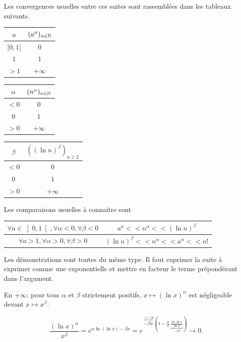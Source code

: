 \begin{prop}
Les convergences usuelles entre ces suites sont rassemblées dans les tableaux suivants. 
\renewcommand{\arraystretch}{1.3}
\begin{center}
\hfill
\begin{tabular}{c|c}
$a$  & $(a^n)_{n\in\mathbb{N}}$\\ \hline
$]0,1[$ & 0 \\ \hline
$1$ & $1$ \\ \hline
$>1$ & $+\infty$
\end{tabular}
\hfill
\begin{tabular}{c|c}
$\alpha$  & $(n^\alpha)_{n\in\mathbb{N}}$\\ \hline
$<0$ & $0$ \\ \hline
$0$ & $1$ \\ \hline
$>0$ & $+\infty$
\end{tabular}
\hfill
\begin{tabular}{c|c}
$\beta$  & $((\ln n)^\beta)_{n\geq 2}$\\ \hline
$<0$ & $0$ \\ \hline
$0$ & $1$ \\ \hline
$>0$ & $+\infty$
\end{tabular}
\end{center}

Les comparaisons usuelles à connaitre sont
\begin{center}
\renewcommand{\arraystretch}{1.5}
\begin{tabular}{c|c}
 $\forall a\in \left]0,1 \right[, \forall \alpha <0, \forall \beta <0$ & $a^n << n^\alpha << (\ln n )^\beta$ \\ \hline
 $\forall a>1, \forall \alpha >0, \forall \beta >0$ &  $(\ln n )^\beta << n^\alpha << a^n << n!$
\end{tabular}
\end{center}
\end{prop}
\begin{demo}
 Les démonstrations sont toutes du même type. Il faut exprimer la suite à exprimer comme une exponentielle et mettre en facteur le terme prépondérant dans l'argument.
\end{demo}
\begin{prop}
  En $+\infty$: pour tous $\alpha$ et $\beta$ strictement positifs, $x\mapsto (\ln x)^{\alpha}$ est négligeable devant $x\mapsto x^\beta$.
\end{prop}
\begin{demo}
\[
  \frac{(\ln x)^\alpha}{x^\beta} = e^{\alpha \ln(\ln x) - \beta x}
  =e^{\overset{\rightarrow - \infty}{\overbrace{-\beta x}}\left( 1 - \frac{\alpha}{\beta}\, \underset{\rightarrow 0 }{\underbrace{\frac{\ln \ln x}{\ln x}}}\right)}
  \rightarrow 0.
\]

\end{demo}

